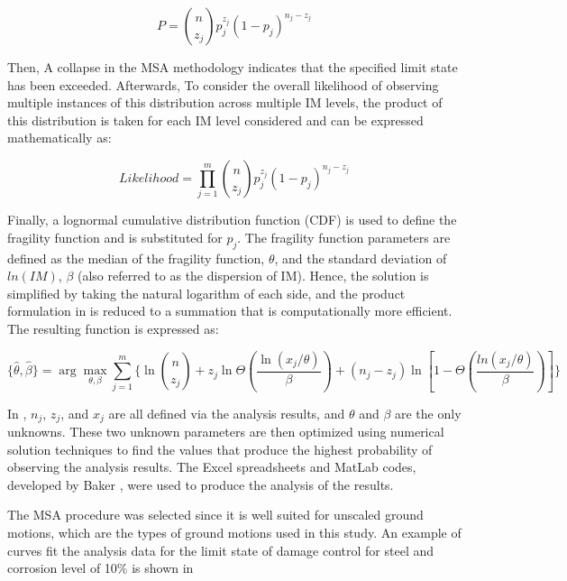 \begin{equation}
   P=\binom{n}{z_{j}}p_{j}^{z_{j}}(1-p_{j})^{n_{j}-z_{j}} 
   \label{eq:P_MSA}
\end{equation}

Then, A collapse in the MSA methodology indicates that the specified limit state has been exceeded. Afterwards, To consider the overall likelihood of observing multiple instances of this distribution across multiple IM levels, the product of this distribution is taken for each IM level considered and can be expressed mathematically as:

\begin{equation}
   Likelihood=\prod_{j=1}^{m} \binom{n}{z_{j}}p_{j}^{z_{j}}(1-p_{j})^{n_{j}-z_{j}} 
   \label{eq:likelihood_MSA}
\end{equation}

Finally, a lognormal cumulative distribution function (CDF) is used to define the fragility function and is substituted for $p_j$. The fragility function parameters are defined as the median of the fragility function, $\theta$, and the standard deviation of $ln(IM)$, $\beta$ (also referred to as the dispersion of IM). Hence, the solution is simplified by taking the natural logarithm of each side, and the product formulation in is reduced to a summation that is computationally more efficient. The resulting function is expressed as:

\begin{equation}
  \{\hat{\theta},\hat{\beta}\}=\arg \max_{\theta,\beta} \sum_{j=1}^{m} \bigg\{\ln\binom{n}{z_{j}} +z_{j}\ln\Theta\left(\frac{\ln(x_{j}/\theta)}{\beta}\right) + (n_{j}-z_{j})\ln\left[1-\Theta\left(\frac{ln(x_{j}/\theta)}{\beta}\right)\right]\bigg\} 
  \label{eq:hat_theta_beta_MSA}
\end{equation}

In , $n_j$, $z_j$, and $x_j$ are all defined via the analysis results, and $\theta$ and $\beta$ are the only unknowns. These two unknown parameters are then optimized using numerical solution techniques to find the values that produce the highest probability of observing the analysis results. The Excel spreadsheets and MatLab codes, developed by Baker \cite{Baker2015}, were used to produce the analysis of the results.

The MSA procedure was selected since it is well suited for unscaled ground motions, which are the types of ground motions used in this study. An example of curves fit the analysis data for the limit state of damage control for steel and corrosion level of 10\% is shown in 

